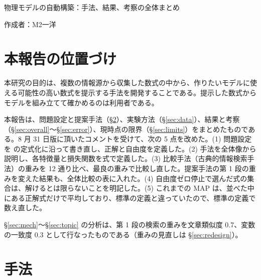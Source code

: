\documentclass[a4j,dvipdfmx,11pt]{jresume}
\begin{document}

\medskip
\begin{center}
  {\Large 物理モデルの自動構築：手法、結果、考察の全体まとめ}
\end{center}

\begin{flushright}
作成者：M2\quad 一洋
\end{flushright}
\medskip

\section{本報告の位置づけ}
本研究の目的は、複数の情報源から収集した数式の中から、作りたいモデルに使える可能性の高い数式を提示する手法を開発することである。提示した数式からモデルを組み立てて確かめるのは利用者である。

本報告は、問題設定と提案手法（\S\ref{sec:method}）、実験方法（\S\ref{sec:data}）、結果と考察（\S\ref{sec:overall}〜\S\ref{sec:error}）、現時点の限界（\S\ref{sec:limits}）をまとめたものである。8 月 31 日版に頂いたコメントを受けて、次の 5 点を改めた。(1) 問題設定を \citet{CombineEq} の定式化に沿って書き直し、正解と自由度を定義した。(2) 手法を全体像から説明し、各特徴量と損失関数を式で定義した。(3) 比較手法（古典的情報検索手法）の重みを 12 通り比べ、最良の重みで比較し直した。提案手法の第 1 段の重みを変えた結果も、全体比較の表に入れた。(4) 自由度ゼロ停止で選んだ式の集合は、解けるとは限らないことを明記した。(5) これまでの MAP は、並べた中にある正解式だけで平均しており、標準の定義と違っていたので、標準の定義で数え直した。

\S\ref{sec:mech}〜\S\ref{sec:topic} の分析は、第 1 段の検索の重みを文章類似度 0.7、変数の一致度 0.3 として行なったものである（重みの見直しは \S\ref{sec:redesign}）。

\section{手法}\label{sec:method}
\end{document}
